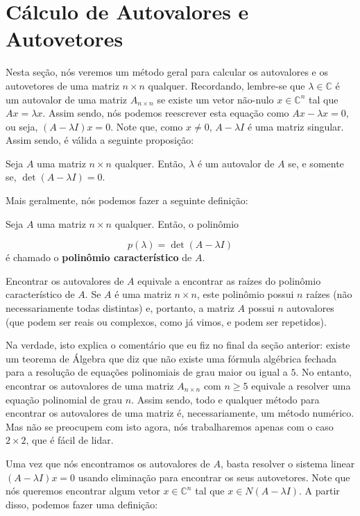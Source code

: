 \section{Cálculo de Autovalores e Autovetores}

Nesta seção, nós veremos um método geral para calcular os autovalores e os autovetores de uma matriz $n\times n$ qualquer. Recordando, lembre-se que $\lambda\in\mathbb{C}$ é um autovalor de uma matriz $A_{n\times n}$ se existe um vetor não-nulo $x\in\mathbb{C}^n$ tal que $Ax = \lambda x$. Assim sendo, nós podemos reescrever esta equação como $Ax - \lambda x = 0$, ou seja, $(A - \lambda I)x = 0$. Note que, como $x\neq 0$, $A - \lambda I$ é uma matriz singular. Assim sendo, é válida a seguinte proposição:

\begin{Proposition}
	Seja $A$ uma matriz $n\times n$ qualquer. Então, $\lambda$ é um autovalor de $A$ se, e somente se, $\det(A - \lambda I) = 0$.
\end{Proposition}

Mais geralmente, nós podemos fazer a seguinte definição:

\begin{Definition}
	Seja $A$ uma matriz $n\times n$ qualquer. Então, o polinômio
	
	$$
	p(\lambda) = \det(A - \lambda I)
	$$
	é chamado o \textbf{polinômio característico} de $A$.
\end{Definition}

Encontrar os autovalores de $A$ equivale a encontrar as raízes do polinômio característico de $A$. Se $A$ é uma matriz $n\times n$, este polinômio possui $n$ raízes (não necessariamente todas distintas) e, portanto, a matriz $A$ possui $n$ autovalores (que podem ser reais ou complexos, como já vimos, e podem ser repetidos).

Na verdade, isto explica o comentário que eu fiz no final da seção anterior: existe um teorema de Álgebra que diz que não existe uma fórmula algébrica fechada para a resolução de equações polinomiais de grau maior ou igual a $5$. No entanto, encontrar os autovalores de uma matriz $A_{n\times n}$ com $n\geq 5$ equivale a resolver uma equação polinomial de grau $n$. Assim sendo, todo e qualquer método para encontrar os autovalores de uma matriz é, necessariamente, um método numérico. Mas não se preocupem com isto agora, nós trabalharemos apenas com o caso $2\times 2$, que é fácil de lidar.

Uma vez que nós encontramos os autovalores de $A$, basta resolver o sistema linear $(A - \lambda I)x = 0$ usando eliminação para encontrar os seus autovetores. Note que nós queremos encontrar algum vetor $x\in\mathbb{C}^n$ tal que $x\in N(A - \lambda I)$. A partir disso, podemos fazer uma definição:

